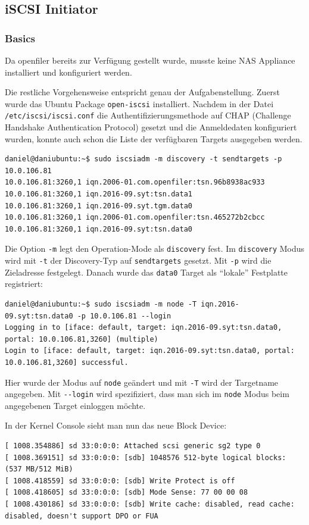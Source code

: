 \subsection{iSCSI Initiator}
\subsubsection{Basics}
Da openfiler bereits zur Verfügung gestellt wurde, musste keine NAS Appliance installiert und konfiguriert werden.

Die restliche Vorgehensweise entspricht genau der Aufgabenstellung. Zuerst wurde das Ubuntu Package \texttt{open-iscsi} installiert. Nachdem in der Datei \texttt{/etc/iscsi/iscsi.conf} die Authentifizierungsmethode auf CHAP (Challenge Handshake Authentication Protocol) gesetzt und die Anmeldedaten konfiguriert wurden, konnte auch schon die Liste der verfügbaren Targets ausgegeben werden.

\begin{lstlisting}[style=bash, caption=Verfügbare Targets]
daniel@daniubuntu:~$ sudo iscsiadm -m discovery -t sendtargets -p 10.0.106.81
10.0.106.81:3260,1 iqn.2006-01.com.openfiler:tsn.96b8938ac933
10.0.106.81:3260,1 iqn.2016-09.syt:tsn.data1
10.0.106.81:3260,1 iqn.2016-09.syt.tgm.data0
10.0.106.81:3260,1 iqn.2006-01.com.openfiler:tsn.465272b2cbcc
10.0.106.81:3260,1 iqn.2016-09.syt:tsn.data0
\end{lstlisting}
Die Option \texttt{-m} legt den Operation-Mode als \texttt{discovery} fest. Im \texttt{discovery} Modus wird mit \texttt{-t} der Discovery-Typ auf \texttt{sendtargets} gesetzt. Mit \texttt{-p} wird die Zieladresse festgelegt.
Danach wurde das \texttt{data0} Target als ``lokale'' Festplatte registriert:
\begin{lstlisting}[style=bash, caption=Target ``lokal'' registrieren]
daniel@daniubuntu:~$ sudo iscsiadm -m node -T iqn.2016-09.syt:tsn.data0 -p 10.0.106.81 --login
Logging in to [iface: default, target: iqn.2016-09.syt:tsn.data0, portal: 10.0.106.81,3260] (multiple)
Login to [iface: default, target: iqn.2016-09.syt:tsn.data0, portal: 10.0.106.81,3260] successful.
\end{lstlisting}
Hier wurde der Modus auf \texttt{node} geändert und mit \texttt{-T} wird der Targetname angegeben. Mit \texttt{-{}-login} wird spezifiziert, dass man sich im \texttt{node} Modus beim angegebenen Target einloggen möchte.

In der Kernel Console sieht man nun das neue Block Device:
\begin{lstlisting}[style=bash, caption=neues Block Device]
[ 1008.354886] sd 33:0:0:0: Attached scsi generic sg2 type 0
[ 1008.369151] sd 33:0:0:0: [sdb] 1048576 512-byte logical blocks: (537 MB/512 MiB)
[ 1008.418559] sd 33:0:0:0: [sdb] Write Protect is off
[ 1008.418605] sd 33:0:0:0: [sdb] Mode Sense: 77 00 00 08
[ 1008.430186] sd 33:0:0:0: [sdb] Write cache: disabled, read cache: disabled, doesn't support DPO or FUA
\end{lstlisting}

